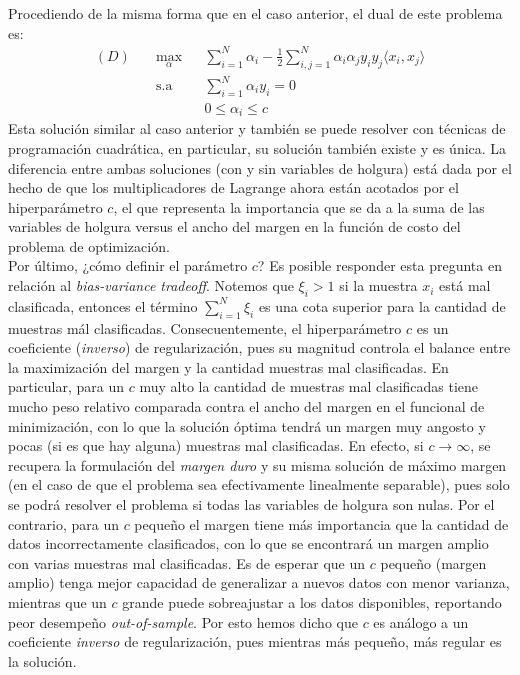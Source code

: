 Procediendo de la misma forma que en el caso anterior, el dual de este problema es:
\begin{equation}
\begin{aligned}
(D)\quad & \underset{\alpha}{\text{max}}
& & \sum\limits_{i=1}^{N}\alpha_i - \frac{1}{2} \sum\limits_{i,j=1}^{N} \alpha_i \alpha_j y_i y_j \langle x_i, x_j\rangle\\
& \text{s.a}
& & \sum\limits_{i=1}^{N} \alpha_i y_i= 0 \\
& &  &0 \leq \alpha_i \leq c
\end{aligned}
\end{equation}
Esta solución similar al caso anterior y también se puede resolver con técnicas de programación cuadrática, en particular, su solución también existe y es única. La diferencia entre ambas soluciones (con y sin variables de holgura) está dada por el hecho de que los multiplicadores de Lagrange ahora están acotados por el hiperparámetro $c$, el que representa la importancia que se da a la suma de las variables de holgura versus el ancho del margen en la función de costo del problema de optimización.\\

Por último, ¿cómo definir el parámetro $c$? Es posible responder esta pregunta en relación al \textit{bias-variance tradeoff}. Notemos que $\xi_i>1$ si la muestra $x_i$ está mal clasificada, entonces el término $\sum_{i=1}^{N} \xi_i$ es una cota superior para la cantidad de muestras mál clasificadas. Consecuentemente, el hiperparámetro $c$ es un coeficiente (\emph{inverso}) de regularización, pues su magnitud controla el balance entre la maximización del margen y la cantidad muestras mal clasificadas. En particular, para un $c$ muy alto la cantidad de muestras mal clasificadas tiene mucho peso relativo comparada contra el ancho del margen en el funcional de minimización, con lo que la solución óptima tendrá un margen muy angosto y pocas (si es que hay alguna) muestras mal clasificadas. En efecto, si $c\to\infty$, se recupera la formulación del \emph{margen duro} y su misma solución de máximo margen (en el caso de que el problema sea efectivamente linealmente separable), pues solo se podrá resolver el problema si todas las variables de holgura son nulas. Por el contrario, para un $c$ pequeño el margen tiene más importancia que la cantidad de datos incorrectamente clasificados, con lo que se encontrará un margen amplio con varias muestras mal clasificadas. Es de esperar que un $c$ pequeño (margen amplio) tenga mejor capacidad de generalizar a nuevos datos con menor varianza, mientras que un $c$ grande puede sobreajustar a los datos disponibles, reportando peor desempeño \emph{out-of-sample}. Por esto hemos dicho que $c$ es análogo a un coeficiente \emph{inverso} de regularización, pues mientras más pequeño, más regular es la solución. \\

